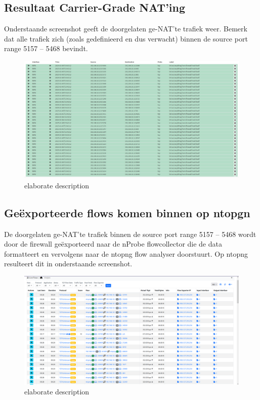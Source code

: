 \subsection{Resultaat Carrier-Grade NAT’ing}
Onderstaande screenshot geeft de doorgelaten ge-NAT’te trafiek weer. Bemerk dat alle trafiek zich (zoals gedefinieerd en dus verwacht) binnen de source port range 5157 – 5468 bevindt.

\begin{figure}[H]
    \includegraphics[width=\textwidth]{graphics/nmap_firewall_table.PNG}
    \caption[OPNsense CGN regels in werking deel 2]{elaborate description}
    \label{fig:FirewallGCNWorksB}
\end{figure}

\subsection{Geëxporteerde flows komen binnen op ntopgn}
De doorgelaten ge-NAT’te trafiek binnen de source port range 5157 – 5468 wordt door de firewall geëxporteerd naar de nProbe flowcollector die de data formatteert en vervolgens naar de ntopng flow analyser doorstuurt. Op ntopng resulteert dit in onderstaande screenshot.

\begin{figure}[htb]
    \includegraphics[width=\textwidth]{graphics/nmap_scan_flows.PNG}
    \caption[ntopng met toekomende flows]{elaborate description}
    \label{fig:ntopngFlows}
\end{figure}

